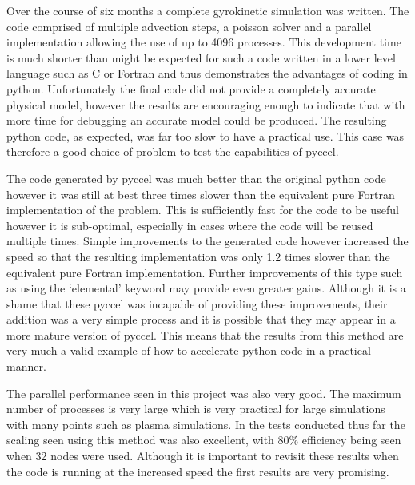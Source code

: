 
Over the course of six months a complete 
gyrokinetic simulation was written. The code comprised of multiple advection steps, a poisson solver and a parallel implementation allowing the use of up to 4096 processes. This development time is much shorter than might be expected for such a code written in a lower level language such as C or Fortran and thus demonstrates the advantages of coding in python.
Unfortunately the final code did not provide a completely accurate physical model, however the results are encouraging enough to indicate that with more time for debugging an accurate model could be produced.
The resulting python code, as expected, was far too slow to have a practical use. This case was therefore a good choice of problem to test the capabilities of pyccel.

The code generated by pyccel was much better than the original python code however it was still at best three times slower than the equivalent pure Fortran implementation of the problem. This is sufficiently fast for the code to be useful however it is sub-optimal, especially in cases where the code will be reused multiple times. Simple improvements to the generated code however increased the speed so that the resulting implementation was only 1.2 times slower than the equivalent pure Fortran implementation. Further improvements of this type such as using the `elemental' keyword may provide even greater gains. Although it is a shame that these pyccel was incapable of providing these improvements, their addition was a very simple process and it is possible that they may appear in a more mature version of pyccel. This means that the results from this method are very much a valid example of how to accelerate python code in a practical manner.

The parallel performance seen in this project was also very good. The maximum number of processes is very large which is very practical for large simulations  with many points such as plasma simulations. In the tests conducted thus far the scaling seen using this method was also excellent, with 80\% efficiency being seen when 32 nodes were used. Although it is important to revisit these results when the code is running at the increased speed the first results are very promising.

